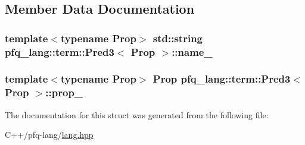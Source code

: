 \subsection{Member Data Documentation}
\hypertarget{structpfq__lang_1_1term_1_1Pred3_ac6c3e6209e74470fe1e97a1c0d7187a7}{
\subsubsection[{name\+\_\+}]{\setlength{\rightskip}{0pt plus 5cm}template$<$typename Prop$>$ std\+::string {\bf pfq\+\_\+lang\+::term\+::\+Pred3}$<$ {\bf Prop} $>$\+::name\+\_\+}}\label{structpfq__lang_1_1term_1_1Pred3_ac6c3e6209e74470fe1e97a1c0d7187a7}
\hypertarget{structpfq__lang_1_1term_1_1Pred3_aa6450a183d05751a2d9cbfcf3b01a1dd}{
\subsubsection[{prop\+\_\+}]{\setlength{\rightskip}{0pt plus 5cm}template$<$typename Prop$>$ {\bf Prop} {\bf pfq\+\_\+lang\+::term\+::\+Pred3}$<$ {\bf Prop} $>$\+::prop\+\_\+}}\label{structpfq__lang_1_1term_1_1Pred3_aa6450a183d05751a2d9cbfcf3b01a1dd}


The documentation for this struct was generated from the following file\+:\begin{DoxyCompactItemize}
\item 
C++/pfq-\/lang/\hyperlink{lang_8hpp}{lang.\+hpp}\end{DoxyCompactItemize}
